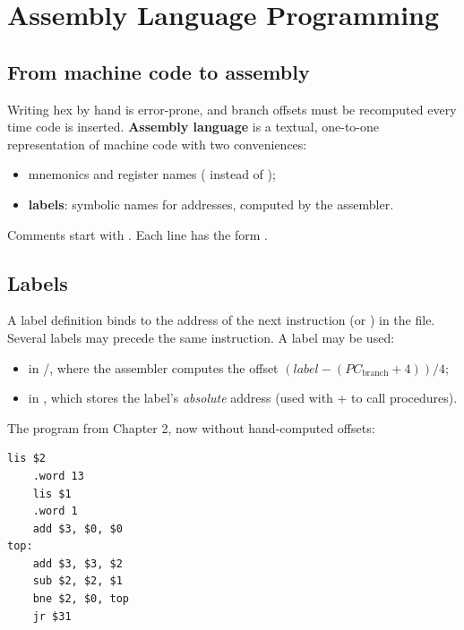 \chapter{Assembly Language Programming}

\section{From machine code to assembly}

Writing hex by hand is error-prone, and branch offsets must be recomputed every time code
is inserted. \textbf{Assembly language} is a textual, one-to-one representation of machine
code with two conveniences:
\begin{itemize}
  \item mnemonics and register names ( instead of );
  \item \textbf{labels}: symbolic names for addresses, computed by the assembler.
\end{itemize}
Comments start with \code{;}. Each line has the form
.

\section{Labels}

A label definition  binds  to the address of the next instruction
(or ) in the file. Several labels may precede the same instruction. A label may be
used:
\begin{itemize}
  \item in /, where the assembler computes the offset
        $(\mathit{label} - (\mathit{PC}_{\text{branch}} + 4))/4$;
  \item in , which stores the label's \emph{absolute} address
        (used with  +  to call procedures).
\end{itemize}

\begin{example}
The program from Chapter 2, now without hand-computed offsets:
\begin{lstlisting}[style=mips]
    lis $2
    .word 13
    lis $1
    .word 1
    add $3, $0, $0
top:
    add $3, $3, $2
    sub $2, $2, $1
    bne $2, $0, top
    jr $31
\end{lstlisting}
\end{example}

